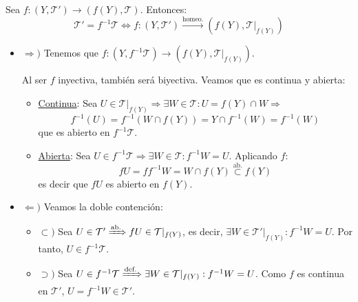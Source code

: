 \begin{prop}
Sea $f: \left( Y, \mathcal{T}' \right) \rightarrow \left( f\left( Y \right), \mathcal{T} \right)$. Entonces:
\[
    \mathcal{T}' = f^{-1}\mathcal{T} \Leftrightarrow f: \left( Y, \mathcal{T}' \right) \xrightarrow{\text{homeo.}} \left( f\left( Y \right), \mathcal{T}|_{f\left( Y \right)} \right)
\]
\end{prop}
\begin{demo}
\begin{itemize}
    \item $\Rightarrow)$ Tenemos que $f: \left( Y, f^{-1}\mathcal{T} \right) \rightarrow \left( f\left( Y \right), \mathcal{T}|_{f\left( Y \right)} \right)$. 

    Al ser $f$ inyectiva, también será biyectiva. Veamos que es continua y abierta:
    \begin{itemize}
        \item \underline{Continua}: Sea $U \in \mathcal{T}|_{f\left( Y \right)} \Rightarrow \exists W \in \mathcal{T}: U = f\left( Y \right) \cap W \Rightarrow$ 
        \[
        f^{-1}\left( U \right) = f^{-1}\left( W \cap f\left( Y \right) \right) = Y \cap f^{-1}\left( W \right) = f^{-1}\left( W \right)
        \]
        que es abierto en $f^{-1}\mathcal{T}$.
        \item \underline{Abierta}: Sea $U \in f^{-1}\mathcal{T} \Rightarrow \exists W \in \mathcal{T}: f^{-1}W = U$. Aplicando $f$:
        \[
        fU = ff^{-1}W = W \cap f\left( Y \right) \stackrel{\text{ab.}}{\subset} f\left( Y \right)
        \]
        es decir que $fU$ es abierto en $f\left( Y \right)$.
    \end{itemize}

    \item $\Leftarrow)$ Veamos la doble contención:
    \begin{itemize}
        \item $\subset)$ Sea $U \in \mathcal{T}' \xRightarrow{\text{ab.}} fU \in \mathcal{T}|_{f\left( Y \right)}$, es decir, $\exists W \in \mathcal{T}'|_{f\left( Y \right)}: f^{-1}W = U$. Por tanto, $U \in f^{-1}\mathcal{T}$. 
        \item $\supset)$ Sea $U \in f^{-1}\mathcal{T} \xRightarrow{\text{def.}} \exists W \in \mathcal{T}|_{f\left( Y \right)}: f^{-1}W = U$. Como $f$ es continua en $\mathcal{T}'$, $U = f^{-1} W \in \mathcal{T}'$.
    \end{itemize}
\end{itemize} 
\end{demo}

